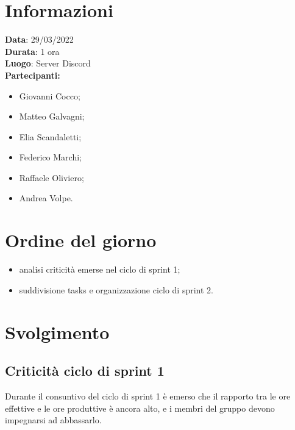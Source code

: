 \documentclass[a4paper, 12pt]{article}
\begin{document}
\makefrontpage

\section{Informazioni}
\textbf{Data}: 29/03/2022\\
\textbf{Durata}: 1 ora\\
\textbf{Luogo}: Server Discord\\

\textbf{Partecipanti:}
\begin{itemize}
	\item Giovanni Cocco;
	\item Matteo Galvagni;
	\item Elia Scandaletti;
	\item Federico Marchi;
	\item Raffaele Oliviero;
	\item Andrea Volpe.
\end{itemize}


\section{Ordine del giorno}
\begin{itemize}
	\item analisi criticità emerse nel ciclo di sprint 1;
	\item suddivisione tasks e organizzazione ciclo di sprint 2.
\end{itemize}

\section{Svolgimento}

\subsection{Criticità ciclo di sprint 1}
Durante il consuntivo del ciclo di sprint 1 è emerso che il rapporto tra le ore effettive e le ore produttive è ancora alto, e i membri del gruppo devono impegnarsi ad abbassarlo.
\end{document}
